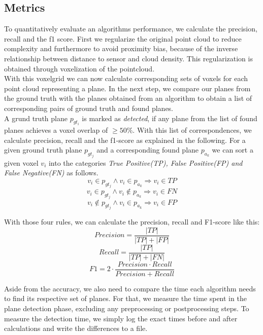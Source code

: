 \documentclass[main.tex]{subfiles}
\begin{document}
\subsection{Metrics}
To quantitatively evaluate an algorithms performance, we calculate the precision, recall and the f1 score.
First we regularize the original point cloud to reduce complexity and furthermore to avoid proximity bias, because of the inverse relationship
between distance to sensor and cloud density. This regularization is obtained through voxelization of the pointcloud.\\
With this voxelgrid we can now calculate corresponding sets of voxels for each point cloud representing a plane.
In the next step, we compare our planes from the ground truth with the planes obtained from an algorithm to obtain a list of corresponding pairs
of ground truth and found planes.\\
A grund truth plane $p_{gt_i}$ is marked as \textit{detected}, if any plane from the list of found planes achieves a voxel overlap of $\geq 50\%$.
With this list of correspondences, we calculate precision, recall and the f1-score as explained in the following.
For a given ground truth plane $p_{gt_j}$ and a corresponding found plane $p_{a_k}$ we can sort a given voxel $v_i$ into the categories
\textit{True Positive(TP), False Positive(FP) and False Negative(FN)} as follows.
$$v_i \in p_{gt_j} \land v_i \in p_{a_k} \Rightarrow v_{i} \in TP$$
$$v_i \in p_{gt_j} \land v_i \notin p_{a_k} \Rightarrow v_{i} \in FN$$
$$v_i \notin p_{gt_j} \land v_i \in p_{a_k} \Rightarrow v_{i} \in FP$$

With those four rules, we can calculate the precision, recall and F1-score like this:
$$Precision = \frac{|TP|}{|TP|+|FP|}$$
$$Recall = \frac{|TP|}{|TP|+|FN|}$$
$$F1 = 2 \cdot\frac{Precision\cdot Recall}{Precision + Recall}$$

Aside from the accuracy, we also need to compare the time each algorithm needs to find its respective set of planes.
For that, we measure the time spent in the plane detection phase, excluding any preprocessing or postprocessing steps.
To measure the detection time, we simply log the exact times before and after calculations and write the differences to a file.\\
\end{document}
